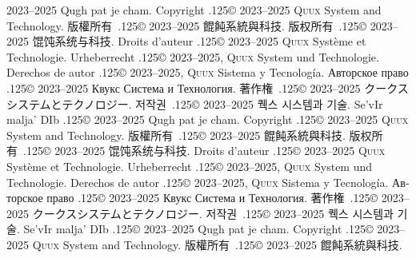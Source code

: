 \documentclass{cookbook}
\begin{document}
{{{	2023--2025 Qugh pat je cham.
Copyright {\lower.125\baselineskip\hbox{\copyright}}
	2023--2025 \textsc{Quux} System and Technology.
版權所有~{\lower.125\baselineskip\hbox{\copyright}}
	2023--2025 餛飩系統與科技.
版权所有~{\lower.125\baselineskip\hbox{\copyright}}
	2023--2025 馄饨系统与科技.
Droits d'auteur {\lower.125\baselineskip\hbox{\copyright}} %
	2023--2025 \textsc{Quux} Système et Technologie.
Urheberrecht {\lower.125\baselineskip\hbox{\copyright}} %
	2023--2025, \textsc{Quux} System und Technologie.
Derechos de autor {\lower.125\baselineskip\hbox{\copyright}} %
	2023--2025, \textsc{Quux} Sistema y Tecnología.
\foreignlanguage{russian}{Авторское право} %
	{\lower.125\baselineskip\hbox{\copyright}}
	2023–2025 \foreignlanguage{russian}{Квукс Система и Технология.}
著作権~{\lower.125\baselineskip\hbox{\copyright}}
	2023--2025 クークスシステムとテクノロジー.
저작권~{\lower.125\baselineskip\hbox{\copyright}}
	2023--2025 퀙스 시스템과 기술.
Se'vIr malja' DIb {\lower.125\baselineskip\hbox{\copyright}} %
	2023--2025 Qugh pat je cham.
Copyright {\lower.125\baselineskip\hbox{\copyright}}
	2023--2025 \textsc{Quux} System and Technology.
版權所有~{\lower.125\baselineskip\hbox{\copyright}}
	2023--2025 餛飩系統與科技.
版权所有~{\lower.125\baselineskip\hbox{\copyright}}
	2023--2025 馄饨系统与科技.
Droits d'auteur {\lower.125\baselineskip\hbox{\copyright}} %
	2023--2025 \textsc{Quux} Système et Technologie.
Urheberrecht {\lower.125\baselineskip\hbox{\copyright}} %
	2023--2025, \textsc{Quux} System und Technologie.
Derechos de autor {\lower.125\baselineskip\hbox{\copyright}} %
	2023--2025, \textsc{Quux} Sistema y Tecnología.
\foreignlanguage{russian}{Авторское право} %
	{\lower.125\baselineskip\hbox{\copyright}}
	2023–2025 \foreignlanguage{russian}{Квукс Система и Технология.}
著作権~{\lower.125\baselineskip\hbox{\copyright}}
	2023--2025 クークスシステムとテクノロジー.
저작권~{\lower.125\baselineskip\hbox{\copyright}}
	2023--2025 퀙스 시스템과 기술.
Se'vIr malja' DIb {\lower.125\baselineskip\hbox{\copyright}} %
	2023--2025 Qugh pat je cham.
Copyright {\lower.125\baselineskip\hbox{\copyright}}
	2023--2025 \textsc{Quux} System and Technology.
版權所有~{\lower.125\baselineskip\hbox{\copyright}}
	2023--2025 餛飩系統與科技.
}}}
\end{document}
